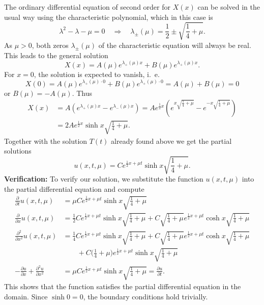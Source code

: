 \begin{loesung}
\begin{teilaufgaben}
The ordinary differential equation of second order for $X(x)$ can
be solved in the usual way using the characteristic polynomial,
which in this case is
\[
\lambda^2-\lambda-\mu=0
\quad
\Rightarrow
\quad
\lambda_{\pm}(\mu)=\frac12\pm\sqrt{\frac14+\mu}.
\]
As $\mu>0$, both zeros $\lambda_{\pm}(\mu)$ of the characteristic
equation will always be real.
This leads to the general solution
\[
X(x)=
A(\mu)e^{\lambda_+(\mu)x}
+
B(\mu)e^{\lambda_+(\mu)x}.
\]
For $x=0$, the solution is expected to vanish, i.~e.
\[
X(0)=
A(\mu)e^{\lambda_+(\mu)\cdot 0}
+
B(\mu)e^{\lambda_+(\mu)\cdot 0}
=A(\mu)+B(\mu)=0
\]
or $B(\mu)=-A(\mu)$.
Thus
\begin{align*}
X(x)&=A(e^{\lambda_+(\mu)x}-e^{\lambda_-(\mu)x})
=Ae^{\frac12x}\left(
e^{x\sqrt{\frac14+\mu}}
-
e^{-x\sqrt{\frac14+\mu}}
\right)
\\
&=2Ae^{\frac12x}\sinh x\sqrt{\frac14+\mu}.
\end{align*}
Together with the solution $T(t)$ already found above we get the
partial solutions
\[
u(x,t,\mu)=
Ce^{\frac12x+\mu t}\sinh x\sqrt{\frac14+\mu}.
\]
{\bf Verification:}
To verify our solution, we substitute the function $u(x,t,\mu)$
into the partial differential equation and compute
\begin{align*}
\frac{\partial}{\partial t}u(x,t,\mu)&=
\mu Ce^{\frac12x+\mu t}\sinh x\sqrt{\frac14+\mu}
\\
\frac{\partial}{\partial x}u(x,t,\mu)&=
\frac12
Ce^{\frac12x+\mu t}\sinh x\sqrt{\frac14+\mu}
+
C\sqrt{\frac14+\mu}e^{\frac12x+\mu t}\cosh x\sqrt{\frac14+\mu}
\\
\frac{\partial^2}{\partial x^2}u(x,t,\mu)&=
\frac14
Ce^{\frac12x+\mu t}\sinh x\sqrt{\frac14+\mu}
+
C\sqrt{\frac14+\mu}e^{\frac12x+\mu t}\cosh x\sqrt{\frac14+\mu}
\\
&\qquad +
C\biggl(\frac14+\mu\biggr)e^{\frac12x+\mu t}\sinh x\sqrt{\frac14+\mu}
\\
-\frac{\partial u}{\partial x}
+
\frac{\partial^2 u}{\partial x^2}
&=
\mu Ce^{\frac12x+\mu t}\sinh x\sqrt{\frac14+\mu}
=
\frac{\partial u}{\partial t}.
\end{align*}
This shows that the function satisfies the partial differential
equation in the domain.
Since $\sinh 0=0$, the boundary conditions hold trivially.
\qedhere
\end{teilaufgaben}
\end{loesung}

